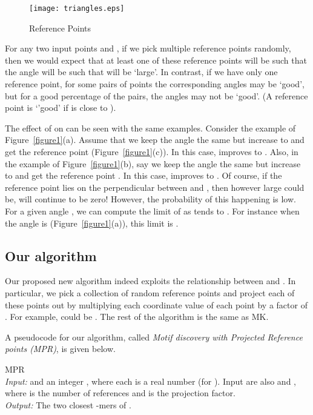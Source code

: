 \documentclass{article}
\theoremstyle{definition}
\theoremstyle{remark}
\begin{document}
\begin{figure}[h]
\texttt{[image: triangles.eps]}
\caption{Reference Points}\label{figure1}
\label{fig:1}       \end{figure}

For any two input points  and , if we pick multiple reference points randomly, then we would expect that at least one of these reference points  will be such that the angle  will be such that  will be `large'. In contrast, if we have only one reference point, for some pairs of points the corresponding angles may be `good', but for a good percentage of the pairs, the angles may not be `good'. (A reference point  is `'good' if  is close to ).

The effect of  on  can be seen with the same examples. Consider the example of Figure~\ref{figure1}(a). Assume that we keep the angle the same but increase  to  and get the reference point  (Figure~\ref{figure1}(c)). In this case,  improves to . Also, in the example of Figure~\ref{figure1}(b), say we keep the angle the same but increase  to  and get the reference point . In this case,  improves to . Of course, if the reference point  lies on the perpendicular between  and , then however large  could be,  will continue to be zero! However, the probability of this happening is low. For a given angle , we can compute the limit of  as  tends to . For instance when the angle is  (Figure~\ref{figure1}(a)), this limit is .

\subsection{Our algorithm}
Our proposed new algorithm indeed exploits the relationship between  and . In particular, we pick a collection  of random reference points and project each of these points out by multiplying each coordinate value of each point by a factor of . For example,  could be . The rest of the algorithm is the same as MK.

A pseudocode for our algorithm, called {\em Motif discovery with Projected Reference points (MPR)},  is given below.

 {\sf MPR}\\
{\em Input:}  and an integer , where each  is a real number (for ). Input are also  and , where  is the number of references and  is the projection factor.\\
{\em Output:} The two closest -mers of .\\
\end{document}
